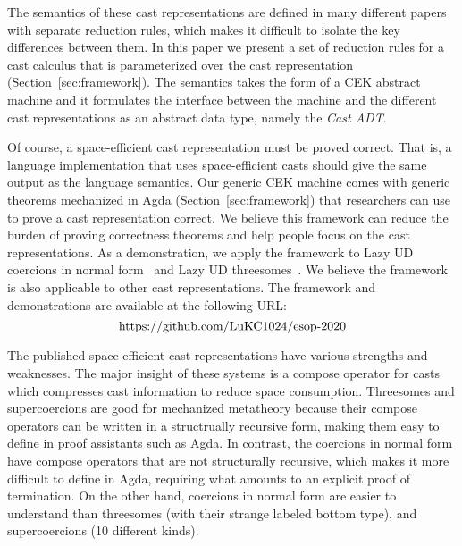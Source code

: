 \documentclass[runningheads]{llncs}
\newcommand{\urlFrameworkAndIllustration}{
	\url{https://github.com/LuKC1024/esop-2020}
}
\begin{document}
The semantics of these cast representations are defined in many
different papers with separate reduction rules, which makes it
difficult to isolate the key differences between them.  In this paper
we present a set of reduction rules for a cast calculus that
is parameterized over the cast representation
(Section~\ref{sec:framework}).
The semantics takes the form of a CEK
abstract machine and it formulates the interface between the machine
and the different cast representations as an abstract data type,
namely the \emph{Cast ADT}.

Of course, a space-efficient cast representation must be proved
correct. That is, a language implementation that uses space-efficient
casts should give the same output as the language semantics. Our
generic CEK machine comes with generic theorems mechanized in Agda
(Section~\ref{sec:framework}) that researchers can use to prove a cast
representation correct.  We believe this framework can reduce the
burden of proving correctness theorems and help people focus on the
cast representations. As a demonstration, we apply the framework to
Lazy UD coercions in normal form~\citep{Siek:2015:BCT:2737924.2737968}
and Lazy UD threesomes~\citep{Siek:2010:TWB:1706299.1706342}. We
believe the framework is also applicable to other cast
representations. The framework and demonstrations are available at the
following URL:
\[\text{\urlFrameworkAndIllustration}\]


The published space-efficient cast representations have various
strengths and weaknesses.  The major insight of these systems is a
compose operator for casts which compresses cast information to reduce
space consumption.  Threesomes and supercoercions are good for
mechanized metatheory because their compose operators 
can be written in a structrually recursive form,
making them easy to define in proof assistants such as
Agda. In contrast, the coercions in normal form have compose operators
that are not structurally recursive, which makes it more difficult to
define in Agda, requiring what amounts to an explicit proof of
termination.
%
On the other hand, coercions in normal form are easier to understand
than threesomes (with their strange labeled bottom type), and
supercoercions (10 different kinds).
\end{document}

